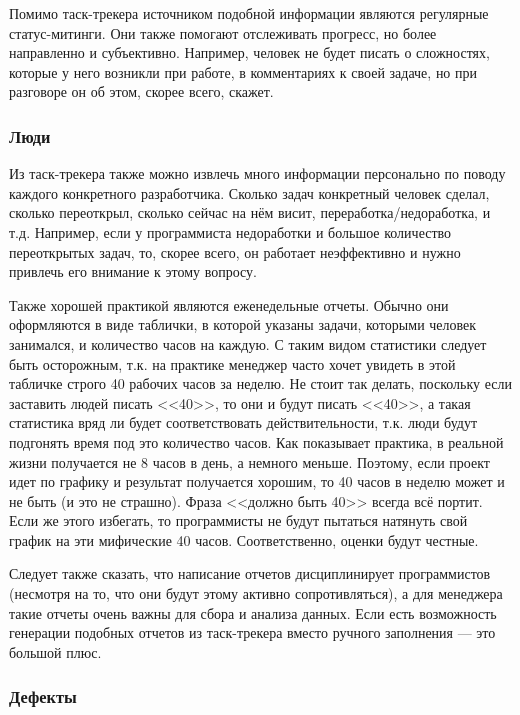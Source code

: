 \documentclass{../../text-style}
\begin{document}
Помимо таск-трекера источником подобной информации являются регулярные статус-митинги. Они также помогают отслеживать прогресс, но более направленно и субъективно. Например, человек не будет писать о сложностях, которые у него возникли при работе, в комментариях к своей задаче, но при разговоре он об этом, скорее всего, скажет.

\subsubsection{Люди}

Из таск-трекера также можно извлечь много информации персонально по поводу каждого конкретного разработчика. Сколько задач конкретный человек сделал, сколько переоткрыл, сколько сейчас на нём висит, переработка/недоработка, и т.д. Например, если у программиста недоработки и большое количество переоткрытых задач, то, скорее всего, он работает неэффективно и нужно привлечь его внимание к этому вопросу.

Также хорошей практикой являются еженедельные отчеты. Обычно они оформляются в виде таблички, в которой указаны задачи, которыми человек занимался, и количество часов на каждую. С таким видом статистики следует быть осторожным, т.к. на практике менеджер часто хочет увидеть в этой табличке строго 40 рабочих часов за неделю. Не стоит так делать, поскольку если заставить людей писать <<40>>, то они и будут писать <<40>>, а такая статистика вряд ли будет соответствовать действительности, т.к. люди будут подгонять время под это количество часов. Как показывает практика, в реальной жизни получается не 8 часов в день, а немного меньше. Поэтому, если проект идет по графику и результат получается хорошим, то 40 часов в неделю может и не быть (и это не страшно). Фраза <<должно быть 40>> всегда всё портит. Если же этого избегать, то программисты не будут пытаться натянуть свой график на эти мифические 40 часов. Соответственно, оценки будут честные.

Следует также сказать, что написание отчетов дисциплинирует программистов (несмотря на то, что они будут этому активно сопротивляться), а для менеджера такие отчеты очень важны для сбора и анализа данных. Если есть возможность генерации подобных отчетов из таск-трекера вместо ручного заполнения --- это большой плюс.

\subsubsection{Дефекты}
\end{document}
